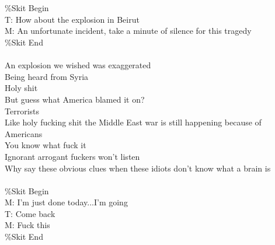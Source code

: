 \documentclass[12pt, b5paper, oneside]{book}
\begin{document}
%
\\\\\%Skit Begin
\\T: How about the explosion in Beirut
\\M: An unfortunate incident, take a minute of silence for this tragedy
\\\%Skit End
%
\\\\An explosion we wished was exaggerated
\\Being heard from Syria
\\Holy shit
\\But guess what America blamed it on?
\\Terrorists
\\Like holy fucking shit the Middle East war is still happening because of Americans
\\You know what fuck it
\\Ignorant arrogant fuckers won't listen
\\Why say these obvious clues when these idiots don't know what a brain is
%
\\\\\%Skit Begin
\\M: I'm just done today...I'm going
\\T: Come back
\\M: Fuck this
\\\%Skit End 

\newpage
\end{document}

